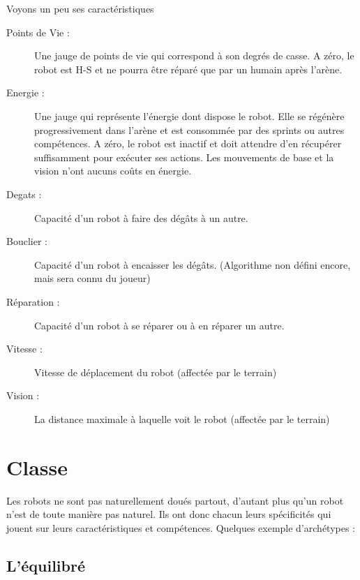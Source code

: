 \documentclass[10pt]{article}
\begin{document}
Voyons un peu ses caractéristiques
\begin{description}
\item[Points de Vie :] Une jauge de points de vie qui correspond à son degrés de casse. A zéro, le robot est H-S et ne pourra être réparé que par un humain après l'arène.
\item[Energie :] Une jauge qui représente l'énergie dont dispose le robot. Elle se régénère progressivement dans l'arène et est consommée par des sprints ou autres compétences. A zéro, le robot est inactif et doit attendre d'en récupérer suffisamment pour exécuter ses actions. Les mouvements de base et la vision n'ont aucuns coûts en énergie.
\item[Degats :] Capacité d'un robot à faire des dégâts à un autre.
\item[Bouclier :] Capacité d'un robot à encaisser les dégâts. (Algorithme non défini encore, mais sera connu du joueur)
\item[Réparation :] Capacité d'un robot à se réparer ou à en réparer un autre.
\item[Vitesse :] Vitesse de déplacement du robot (affectée par le terrain)
\item[Vision :] La distance maximale à laquelle voit le robot (affectée par le terrain)
\end{description}

\section{Classe}

Les robots ne sont pas naturellement doués partout, d'autant plus qu'un robot n'est de toute manière pas naturel. Ils ont donc chacun leurs spécificités qui jouent sur leurs caractéristiques et compétences.
Quelques exemple d'archétypes : 



\subsection{L'équilibré}
\end{document}
